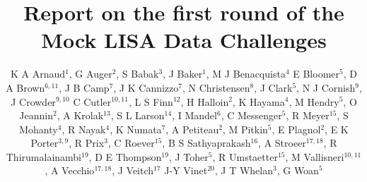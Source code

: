 \documentclass[12pt]{iopart}
\begin{document}
\title[MLDC first round report]{Report on the first round of the Mock LISA Data Challenges}

\author{K A Arnaud$^1$,
G Auger$^2$,
S Babak$^3$,
J Baker$^1$,
M J Benacquista$^4$
E Bloomer$^5$,
D A Brown$^{6,11}$,
J B Camp$^7$,
J K Cannizzo$^7$,
N Christensen$^8$,
J Clark$^5$,
N J Cornish$^9$,
J Crowder$^{9,10}$
C Cutler$^{10,11}$,
L S Finn$^{12}$,
H Halloin$^2$,
K Hayama$^4$,
M Hendry$^5$,
O Jeannin$^2$,
A Krolak$^{13}$,
S L Larson$^{14}$,
I Mandel$^6$,
C Messenger$^5$,
R Meyer$^{15}$,
S Mohanty$^4$,
R Nayak$^4$,
K Numata$^7$,
A Petiteau$^2$,
M Pitkin$^5$,
E Plagnol$^2$,
E K Porter$^{3,9}$,
R Prix$^3$,
C Roever$^{15}$,
B S Sathyaprakash$^{16}$,
A Stroeer$^{17,18}$,
R Thirumalainambi$^{19}$,
D E Thompson$^{19}$,
J Toher$^5$,
R Umstaetter$^{15}$,
M Vallisneri$^{10,11}$,
A Vecchio$^{17,18}$,
J Veitch$^{17}$
J-Y Vinet$^{20}$,
J T Whelan$^3$,
G Woan$^5$}
\end{document}

